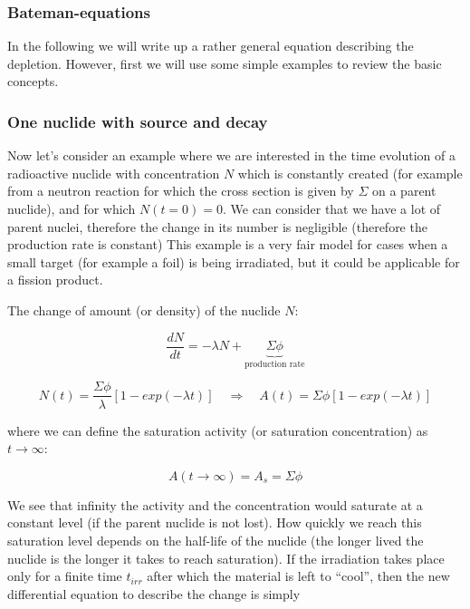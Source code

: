 \subsubsection{Bateman-equations}

In the following we will write up a rather general equation describing the depletion. However, first we will use some simple examples to review the basic concepts.

\subsubsection*{One nuclide with source and decay}

Now let's consider an example where we are interested in the time evolution of a radioactive nuclide with concentration $N$ which is constantly created (for example from a neutron reaction for which the cross section is given by $\Sigma$ on a parent nuclide), and for which $N(t=0)=0$. We can consider that we have a lot of parent nuclei, therefore the change in its number is negligible (therefore the production rate is constant) This example is a very fair model for cases when a small target (for example a foil) is being irradiated, but it could be applicable for a fission product.

The change of amount (or density) of the nuclide $N$:

\begin{equation}
\frac{dN}{dt}=-\lambda N + \underbrace{\Sigma\phi}_{\text{production rate}}
\end{equation}

\begin{equation}
N(t)=\frac{\Sigma\phi}{\lambda}[1-exp(-\lambda t)] \quad \Rightarrow \quad A(t)=\Sigma\phi[1-exp(-\lambda t)]
\end{equation}

\noindent where we can define the saturation activity (or saturation concentration) as $t\rightarrow \infty$:

\begin{equation}
A(t\rightarrow \infty)=A_s=\Sigma\phi
\end{equation}

\noindent We see that infinity the activity and the concentration would saturate at a constant level (if the parent nuclide is not lost). How quickly we reach this saturation level depends on the half-life of the nuclide (the longer lived the nuclide is the longer it takes to reach saturation). If the irradiation takes place only for a finite time $t_{irr}$ after which the material is left to ``cool'', then the new differential equation to describe the change is simply

